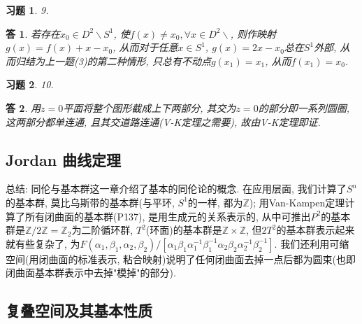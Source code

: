 \documentclass{ctexart}%
\newtheorem*{exercise}{习题}
\newtheorem*{solution}{答}
\theoremstyle{definition}
\theoremstyle{remark}
\begin{document}
\begin{exercise}9.
\end{exercise}
\begin{solution}
若存在$x_0\in D^2\backslash S^1$, 使$f(x)\neq x_0, \forall x\in D^2\backslash$, 则作映射$g(x)=f(x)+x-x_0$, 从而对于任意$x\in S^1$, $g(x)=2x-x_0$总在$S^1$外部, 从而归结为上一题(3)的第二种情形, 只总有不动点$g(x_1)=x_1$, 从而$f(x_1)=x_0$.
\end{solution}

\begin{exercise}10.
\end{exercise}
\begin{solution}
用$z=0$平面将整个图形截成上下两部分, 其交为$z=0$的部分即一系列圆圈, 这两部分都单连通, 且其交道路连通(V-K定理之需要), 故由V-K定理即证. 
\end{solution}

\subsection{Jordan 曲线定理}

总结: 同伦与基本群这一章介绍了基本的同伦论的概念. 在应用层面, 我们计算了$S^n$的基本群, 莫比乌斯带的基本群(与平环, $S^1$的一样, 都为$\mathbb{Z}$); 用Van-Kampen定理计算了所有闭曲面的基本群(P137), 是用生成元的关系表示的, 从中可推出$P^2$的基本群是$\mathbb{Z}/2\mathbb{Z}=\mathbb{Z}_2$为二阶循环群, $T^2$(环面)的基本群是$\mathbb{Z}\times \mathbb{Z}$, 但$2T^2$的基本群表示起来就有些复杂了, 为$F(\alpha_1,\beta_1,\alpha_2, \beta_2)/[\alpha_1\beta_1\alpha^{-1}_1\beta^{-1}_1\alpha_2\beta_2\alpha^{-1}_2\beta^{-1}_2]$. 我们还利用可缩空间(用闭曲面的标准表示, 粘合映射)说明了任何闭曲面去掉一点后都为圆束(也即闭曲面基本群表示中去掉"模掉"的部分).

\subsection{复叠空间及其基本性质}
\end{document}
